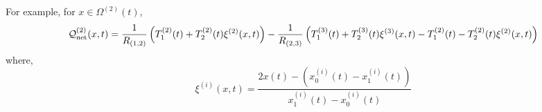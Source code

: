 For example, for $x\in\Omega^{(2)}(t)$,
\begin{gather}
    \mathcal{Q}^{(2)}_{\text{net}}(x,t) = \frac{1}{R_{(1,2)}}\left(T_1^{(2)}(t) + T_2^{(2)}(t)\xi^{(2)}(x,t)\right) - \frac{1}{R_{(2,3)}}\left(T_1^{(3)}(t) + T_2^{(3)}(t)\xi^{(3)}(x,t) - T_1^{(2)}(t) - T_2^{(2)}(t)\xi^{(2)}(x,t)\right)
\end{gather}
where,
\begin{equation}
    \xi^{(i)}(x,t) = \frac{2x(t) - (x_0^{(i)}(t) - x_1^{(i)}(t))}{x_1^{(i)}(t) - x_0^{(i)}(t)}
\end{equation}











